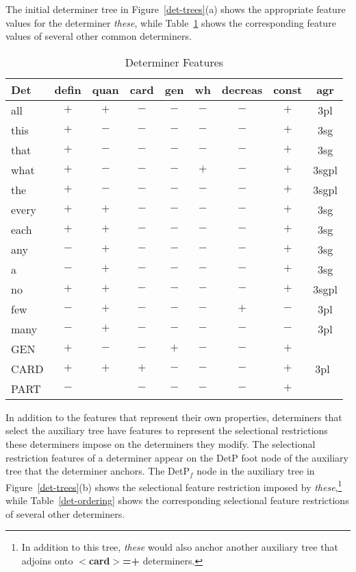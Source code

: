The initial determiner tree in Figure~\ref{det-trees}(a) shows the appropriate
feature values for the determiner {\it these}, while Table~\ref{det-values}
shows the corresponding feature values of several other common determiners.

\begin{table}[hbt]
\centering
\begin{tabular}{|l||c|c|c|c|c|c|c|c|}
\hline
Det&defin&quan&card&gen&wh&decreas&const&agr\\
\hline
\hline
all&$+$&$+$&$-$&$-$&$-$&$-$&$+$&3pl\\
this&$+$&$-$&$-$&$-$&$-$&$-$&$+$&3sg\\
that&$+$&$-$&$-$&$-$&$-$&$-$&$+$&3sg\\
what&$+$&$-$&$-$&$-$&$+$&$-$&$+$&3sgpl\\
the&$+$&$-$&$-$&$-$&$-$&$-$&$+$&3sgpl\\
every&$+$&$+$&$-$&$-$&$-$&$-$&$+$&3sg\\
each&$+$&$+$&$-$&$-$&$-$&$-$&$+$&3sg\\
any&$-$&$+$&$-$&$-$&$-$&$-$&$+$&3sg\\
a&$-$&$+$&$-$&$-$&$-$&$-$&$+$&3sg\\
no&$+$&$+$&$-$&$-$&$-$&$-$&$+$&3sgpl\\
few&$-$&$+$&$-$&$-$&$-$&$+$&$-$&3pl\\
many&$-$&$+$&$-$&$-$&$-$&$-$&$-$&3pl\\
GEN&$+$&$-$&$-$&$+$&$-$&$-$&$+$&\\
CARD&$+$&$+$&$+$&$-$&$-$&$-$&$+$&3pl\footnotemark\ \\
PART&$-$&&$-$&$-$&$-$&$-$&$+$&\\
\hline
\end{tabular}
 \caption{Determiner Features}
\label{det-values}
\end{table}\addtocounter{footnote}{0} 


In addition to the features that represent their own properties, determiners
that select the auxiliary tree have features to represent the selectional
restrictions these determiners impose on the determiners they modify.  The
selectional restriction features of a determiner appear on the DetP foot node
of the auxiliary tree that the determiner anchors.  The DetP$_{f}$ node in the
auxiliary tree in Figure~\ref{det-trees}(b) shows the selectional feature
restriction imposed by {\it these},\footnote{In addition to this tree, {\it
these} would also anchor another auxiliary tree that adjoins onto {\bf
$<$card$>$=+} determiners.} while Table~\ref{det-ordering} shows the
corresponding selectional feature restrictions of several other determiners.

